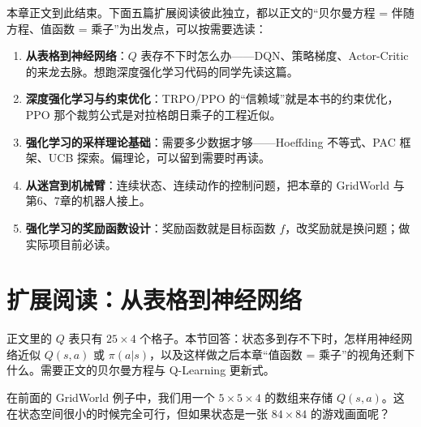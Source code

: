 \begin{tcolorbox}[colback=gray!5, colframe=gray!50, title=扩展阅读导读：五篇选读，各取所需]
本章正文到此结束。下面五篇扩展阅读彼此独立，都以正文的“贝尔曼方程 = 伴随方程、值函数 = 乘子”为出发点，可以按需要选读：
\begin{enumerate}
    \item \textbf{从表格到神经网络}：$Q$ 表存不下时怎么办——DQN、策略梯度、Actor-Critic 的来龙去脉。想跑深度强化学习代码的同学先读这篇。
    \item \textbf{深度强化学习与约束优化}：TRPO/PPO 的“信赖域”就是本书的约束优化，PPO 那个裁剪公式是对拉格朗日乘子的工程近似。
    \item \textbf{强化学习的采样理论基础}：需要多少数据才够——Hoeffding 不等式、PAC 框架、UCB 探索。偏理论，可以留到需要时再读。
    \item \textbf{从迷宫到机械臂}：连续状态、连续动作的控制问题，把本章的 GridWorld 与第6、7章的机器人接上。
    \item \textbf{强化学习的奖励函数设计}：奖励函数就是目标函数 $f$，改奖励就是换问题；做实际项目前必读。
\end{enumerate}
\end{tcolorbox}

\section*{扩展阅读：从表格到神经网络}

\begin{tcolorbox}[colback=gray!5, colframe=gray!50, title=本节导读]
正文里的 $Q$ 表只有 $25 \times 4$ 个格子。本节回答：状态多到存不下时，怎样用神经网络近似 $Q(s,a)$ 或 $\pi(a|s)$，以及这样做之后本章“值函数 = 乘子”的视角还剩下什么。需要正文的贝尔曼方程与 Q-Learning 更新式。
\end{tcolorbox}


在前面的 GridWorld 例子中，我们用一个 $5 \times 5 \times 4$ 的数组来存储 $Q(s, a)$。这在状态空间很小的时候完全可行，但如果状态是一张 $84 \times 84$ 的游戏画面呢？

